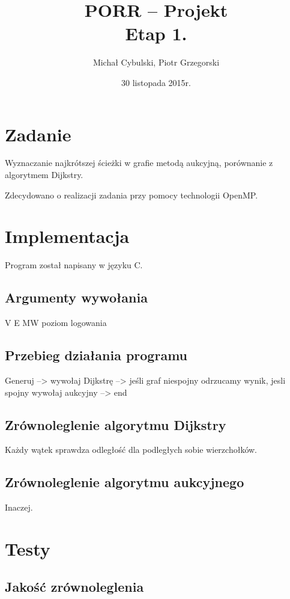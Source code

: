 \documentclass {article}
\author {Michał Cybulski, Piotr Grzegorski}
\title {PORR -- Projekt\\Etap 1.}
\date {30 listopada 2015r.}
\begin{document}
\maketitle

\section {Zadanie}

Wyznaczanie najkrótszej ścieżki w grafie metodą aukcyjną, porównanie z algorytmem Dijkstry.

Zdecydowano o realizacji zadania przy pomocy technologii OpenMP.

\section{Implementacja}

Program został napisany w języku C.

\subsection{Argumenty wywołania}

V E MW poziom logowania

\subsection{Przebieg działania programu}

Generuj --> wywołaj Dijkstrę --> jeśli graf niespojny odrzucamy wynik, jesli spojny wywołaj aukcyjny --> end

\subsection{Zrównoleglenie algorytmu Dijkstry}

Każdy wątek sprawdza odległość dla podległych sobie wierzchołków.

\subsection{Zrównoleglenie algorytmu aukcyjnego}

Inaczej.

\section{Testy}

\subsection{Jakość zrównoleglenia}
\end{document}
